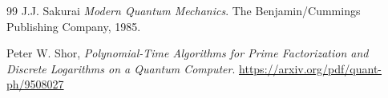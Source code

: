 \documentclass[a4paper]{article}
\begin{document}
\begin{thebibliography}{99}
 J.J. Sakurai \textit{Modern Quantum Mechanics}. The Benjamin/Cummings Publishing Company, 1985.

 Peter W. Shor, \textit{Polynomial-Time Algorithms for Prime Factorization and Discrete Logarithms on a Quantum Computer}. \url{https://arxiv.org/pdf/quant-ph/9508027}




\end{thebibliography}
\end{document}
